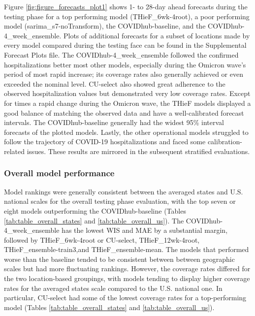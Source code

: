 \documentclass[12pt]{article}
\begin{document}
Figure \ref{fig:figure_forecasts_plot1} shows 1- to 28-day ahead forecasts during the testing phase for a top performing model (THieF\_6wk-4root), a poor performing model (sarima\_s7-noTransform), the COVIDhub-baseline, and the COVIDhub-4\_week\_ensemble. Plots of additional forecasts for a subset of locations made by every model compared during the testing face can be found in the Supplemental Forecast Plots file. The COVIDhub-4\_week\_ensemble followed the confirmed hospitalizations better most other models, especially during the Omicron wave’s period of most rapid increase; its coverage rates also generally achieved or even exceeded the nominal level. CU-select also showed great adherence to the observed hospitalization values but demonstrated very low coverage rates. Except for times a rapid change during the Omicron wave, the THieF models displayed a good balance of matching the observed data and have a well-calibrated forecast intervals. The COVIDhub-baseline generally had the widest 95\% interval forecasts of the plotted models. Lastly, the other operational models struggled to follow the trajectory of COVID-19 hospitalizations and faced some calibration-related issues. These results are mirrored in the subsequent stratified evaluations.

\subsubsection{Overall model performance} \label{testing_overall}
Model rankings were generally consistent between the averaged states and U.S. national scales for the overall testing phase evaluation, with the top seven or eight models outperforming the COVIDhub-baseline (Tables \ref{tab:table_overall_states} and \ref{tab:table_overall_us}). The COVIDhub-4\_week\_ensemble has the lowest WIS and MAE by a substantial margin, followed by THieF\_6wk-4root or CU-select, THieF\_12wk-4root, THieF\_ensemble-train3,and THieF\_ensemble-mean. The models that performed worse than the baseline tended to be consistent between between geographic scales but had more fluctuating rankings. However, the coverage rates differed for the two location-based groupings, with models tending to display higher coverage rates for the averaged states scale compared to the U.S. national one. In particular, CU-select had some of the lowest coverage rates for a top-performing model (Tables \ref{tab:table_overall_states} and \ref{tab:table_overall_us}).
\end{document}
